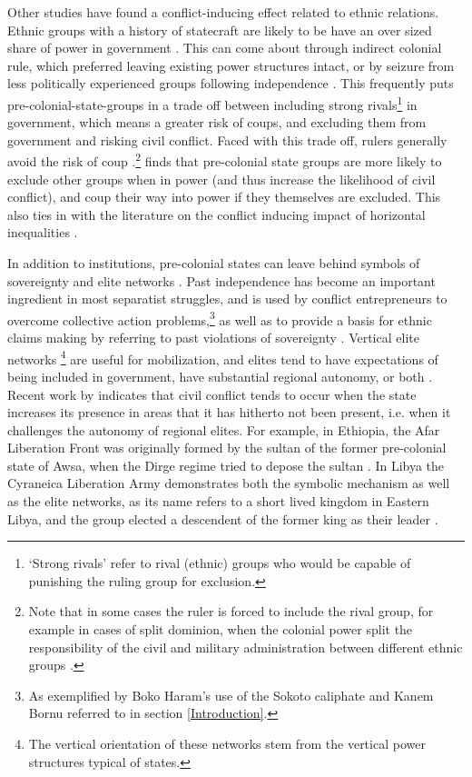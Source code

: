 \documentclass[12pt]{article}
\begin{document}
Other studies have found a conflict-inducing effect related to ethnic relations.
Ethnic groups with a history of statecraft are likely to be have an over sized
share of power in government \citep{Wucherpfennig2016}. This can come about
through indirect colonial rule, which preferred leaving existing power
structures intact, or by seizure from less politically experienced groups
following independence \citep{Paine2019}. This frequently puts
pre-colonial-state-groups in a trade off between including strong
rivals\footnote{`Strong rivals' refer to rival (ethnic) groups who would be
capable of punishing the ruling group for exclusion.} in government, which means
a greater risk of coups, and excluding them from government and risking civil
conflict. Faced with this trade off, rulers generally avoid the risk of coup
\citep{Paine2019, Powell_2014, Roessler_2011}.\footnote{Note that in some cases
	the ruler is forced to include the rival group, for example in cases of
split dominion, when the colonial power split the responsibility of the civil
and military administration between different ethnic groups \citep{Paine2019}.}
\citet{Paine2019} finds that pre-colonial state groups are more likely to
exclude other groups when in power (and thus increase the likelihood of civil
conflict), and coup their way into power if they themselves are excluded. This
also ties in with the literature on the conflict inducing impact of horizontal
inequalities \citep{CEDERMAN_2011}.

In addition to institutions, pre-colonial states can leave behind symbols of
sovereignty and elite networks \citep{Wishman_2022}. Past independence has become an
important ingredient in most separatist struggles, and is used by conflict
entrepreneurs to overcome collective action problems,\footnote{As exemplified by
Boko Haram's use of the Sokoto caliphate and Kanem Bornu referred to in section
\ref{Introduction}.} as well as to provide a basis for ethnic claims making by
referring to past violations of sovereignty \citep{Ahram2019, Shelef2016}.
Vertical elite networks \footnote{The vertical orientation of these networks
stem from the vertical power structures typical of states.} are useful for
mobilization, and elites tend to have expectations of being included in
government, have substantial regional autonomy, or both \citep{Wishman_2022}. Recent
work by \citet{Ying_2020} indicates that civil conflict tends to occur when the
state increases its presence in areas that it has hitherto not been present,
i.e. when it challenges the autonomy of regional elites. For example, in
Ethiopia, the Afar Liberation Front was originally formed by the sultan of the
former pre-colonial state of Awsa, when the Dirge regime tried to depose the
sultan \citep{Shehim1985, Hanfare2011}.  In Libya the Cyraneica Liberation Army
demonstrates both the symbolic mechanism as well as the elite networks, as its
name refers to a short lived kingdom in Eastern Libya, and the group elected a
descendent of the former king as their leader \citep{Ahram2019}. 
\end{document}
